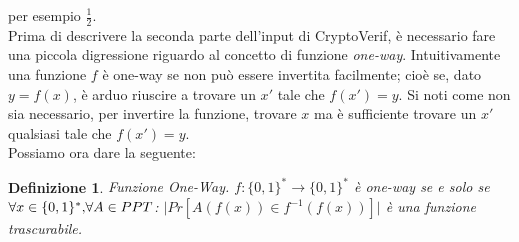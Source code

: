 \documentclass[a4paper,openright,twoside,12pt]{report}
\newtheorem{definizione}{Definizione}[chapter]
\begin{document}
per esempio $\frac{1}{2}$.
\\ 
Prima di descrivere la seconda parte dell'input di CryptoVerif, \`e necessario fare una piccola digressione riguardo al concetto di funzione \emph{one-way}.
Intuitivamente una funzione $f$ \`e one-way se non pu\`o essere invertita facilmente; cio\`e se, dato $y=f(x)$, \`e arduo riuscire a trovare un $x'$ tale che $f(x')=y$. 
Si noti come non sia necessario, per invertire la funzione, trovare $x$ ma \`e sufficiente trovare un $x'$ qualsiasi tale che $f(x')=y$.
\\Possiamo ora dare la seguente:
\begin{definizione}{Funzione One-Way.}
$f: \{0,1\}^*\rightarrow \{0,1\}^*$ \`e one-way se e solo se $\forall x \in  \{0,1\}^* \hbox{,} \forall A \in PPT$:  $\lvert Pr[A(f(x)) \in f^{-1}(f(x))]\rvert$ \`e una funzione 
trascurabile.
\end{definizione}
\end{document}
